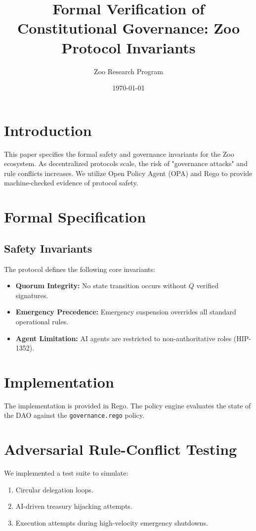 \documentclass[11pt,a4paper]{article}
\title{Formal Verification of Constitutional Governance: Zoo Protocol Invariants}
\author{Zoo Research Program}
\date{\today}
\begin{document}
\zoocoverpage

\section{Introduction}
This paper specifies the formal safety and governance invariants for the Zoo ecosystem. As decentralized protocols scale, the risk of "governance attacks" and rule conflicts increases. We utilize Open Policy Agent (OPA) and Rego to provide machine-checked evidence of protocol safety.

\section{Formal Specification}
\subsection{Safety Invariants}
The protocol defines the following core invariants:
\begin{itemize}
    \item \textbf{Quorum Integrity:} No state transition occurs without $Q$ verified signatures.
    \item \textbf{Emergency Precedence:} Emergency suspension overrides all standard operational rules.
    \item \textbf{Agent Limitation:} AI agents are restricted to non-authoritative roles (HIP-1352).
\end{itemize}

\section{Implementation}
The implementation is provided in Rego. The policy engine evaluates the state of the DAO against the \texttt{governance.rego} policy.

\section{Adversarial Rule-Conflict Testing}
We implemented a test suite to simulate:
\begin{enumerate}
    \item Circular delegation loops.
    \item AI-driven treasury hijacking attempts.
    \item Execution attempts during high-velocity emergency shutdowns.
\end{enumerate}
\end{document}
